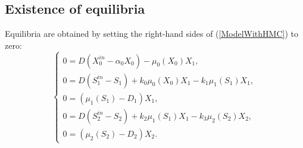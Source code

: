 \documentclass[runningheads]{llncs}
\begin{document}
\subsection{Existence of equilibria}
Equilibria are obtained by setting the right-hand sides of (\ref{ModelWithHMC}) to zero:
\begin{equation}        \label{SysAlgWithHMC}
\begin{cases}
0 = D(X_0^{in}-\alpha_0 X_0) - \mu_0(X_0) X_1,\\
0 = D(S_1^{in}-S_1) + k_0 \mu_0(X_0) X_1 - k_1 \mu_1(S_1) X_1,\\
0 = (\mu_1(S_1)-D_1) X_1,\\
0 = D(S_2^{in}-S_2) + k_2 \mu_1(S_1) X_1 - k_3 \mu_2(S_2) X_2,\\
0 = (\mu_2(S_2)-D_2) X_2.
\end{cases}
\end{equation}
\end{document}

